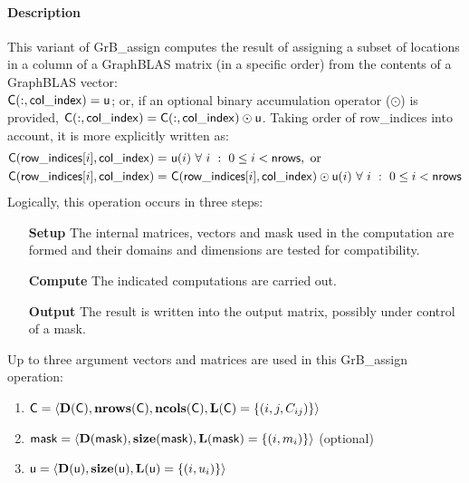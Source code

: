 \paragraph{Description}

This variant of {\sf GrB\_assign} computes the result of assigning a subset of
locations in a column of a GraphBLAS matrix (in a specific order) from the 
contents of a GraphBLAS vector: \\
${\sf C}(:,{\sf col\_index}) = {\sf u}$; or, if an 
optional binary accumulation operator ($\odot$) is provided, 
${\sf C}(:,{\sf col\_index}) = 
{\sf C}(:,{\sf col\_index}) \odot {\sf u}$. Taking order of {\sf row\_indices} 
into account, it is more explicitly written as:
\[
\begin{aligned}
    {\sf C}({\sf row\_indices}[i],{\sf col\_index}) = &\ {\sf u}(i) 
    \ \forall \ i \ : \ 0 \leq i < {\sf nrows}, \mbox{~or~}
    \\
    {\sf C}({\sf row\_indices}[i],{\sf col\_index}) = &\ 
    {\sf C}({\sf row\_indices}[i],{\sf col\_index}) \odot {\sf u}(i) 
    \ \forall \ i \ : \ 0 \leq i < {\sf nrows}
\end{aligned}
\]  
Logically, this operation occurs in three steps:
\begin{enumerate}[leftmargin=0.75in]
\item[\bf Setup] The internal matrices, vectors and mask used in the computation are formed 
and their domains and dimensions are tested for compatibility.
\item[\bf Compute] The indicated computations are carried out.
\item[\bf Output] The result is written into the output matrix, possibly under 
control of a mask.
\end{enumerate}

Up to three argument vectors and matrices are used in this {\sf GrB\_assign} 
operation:
\begin{enumerate}
	\item ${\sf C} = \langle \bold{D}({\sf C}),\bold{nrows}({\sf C}),
    \bold{ncols}({\sf C}),\bold{L}({\sf C}) = \{(i,j,C_{ij}) \} \rangle$
    
	\item ${\sf mask} = \langle \bold{D}({\sf mask}),\bold{size}({\sf mask}),
    \bold{L}({\sf mask}) = \{(i,m_{i}) \} \rangle$ (optional)

	\item ${\sf u} = \langle \bold{D}({\sf u}),\bold{size}({\sf u}),
    \bold{L}({\sf u}) = \{(i,u_i) \} \rangle$
\end{enumerate}

